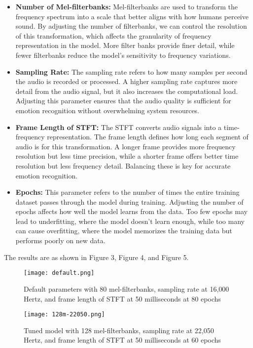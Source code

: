\begin{itemize}
    \item \textbf{Number of Mel-filterbanks:} Mel-filterbanks are used to transform the frequency spectrum into a scale that better aligns with how humans perceive sound. By adjusting the number of filterbanks, we can control the resolution of this transformation, which affects the granularity of frequency representation in the model. More filter banks provide finer detail, while fewer filterbanks reduce the model’s sensitivity to frequency variations.
    \item \textbf{Sampling Rate:} The sampling rate refers to how many samples per second the audio is recorded or processed. A higher sampling rate captures more detail from the audio signal, but it also increases the computational load. Adjusting this parameter ensures that the audio quality is sufficient for emotion recognition without overwhelming system resources.
    \item \textbf{Frame Length of STFT:} The STFT converts audio signals into a time-frequency representation. The frame length defines how long each segment of audio is for this transformation. A longer frame provides more frequency resolution but less time precision, while a shorter frame offers better time resolution but less frequency detail. Balancing these is key for accurate emotion recognition.
    \item \textbf{Epochs:} This parameter refers to the number of times the entire training dataset passes through the model during training. Adjusting the number of epochs affects how well the model learns from the data. Too few epochs may lead to underfitting, where the model doesn’t learn enough, while too many can cause overfitting, where the model memorizes the training data but performs poorly on new data.

\end{itemize}

The results are as shown in Figure 3, Figure 4, and Figure 5.

\begin{figure}[ht]
    \centering
    \captionsetup{justification=centering}
    \texttt{[image: default.png]}
    \caption{Default parameters with 80 mel-filterbanks, sampling rate at 16,000 Hertz, and frame length of STFT at 50 milliseconds at 80 epochs}
    \label{fig:default}
\end{figure}

\begin{figure}[ht]
    \centering
    \captionsetup{justification=centering}
    \texttt{[image: 128m-22050.png]}
    \caption{Tuned model with 128 mel-filterbanks, sampling rate at 22,050 Hertz, and frame length of STFT at 50 milliseconds at 60 epochs}
    \label{fig:128m-22050}
\end{figure}

